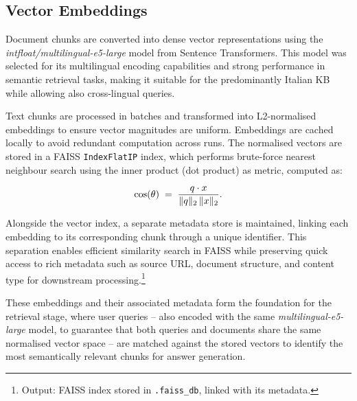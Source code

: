 \begin{spacing}{1.5}
\sloppy
\subsection{Vector Embeddings}
Document chunks are converted into dense vector representations using the \textit{intfloat/multilingual-e5-large} model from Sentence Transformers. This model was selected for its multilingual encoding capabilities and strong performance in semantic retrieval tasks, making it suitable for the predominantly Italian KB while allowing also cross-lingual queries. 

Text chunks are processed in batches and transformed into L2-normalised embeddings to ensure vector magnitudes are uniform. Embeddings are cached locally to avoid redundant computation across runs. The normalised vectors are stored in a FAISS \texttt{IndexFlatIP} index, which performs brute-force nearest neighbour search using the inner product (dot product) as metric, computed as:

\[
\cos(\theta) \;=\; \frac{q \cdot x}{\|q\|_2 \, \|x\|_2}.\\
\]

Alongside the vector index, a separate metadata store is maintained, linking each embedding to its corresponding chunk through a unique identifier. This separation enables efficient similarity search in FAISS while preserving quick access to rich metadata such as source URL, document structure, and content type for downstream processing.\footnote{Output: FAISS index stored in \texttt{.faiss\_db}, linked with its metadata.}

These embeddings and their associated metadata form the foundation for the retrieval stage, where user queries -- also encoded with the same \textit{multilingual-e5-large} model, to guarantee that both queries and documents share the same normalised vector space -- are matched against the stored vectors to identify the most semantically relevant chunks for answer generation.


\end{spacing}
